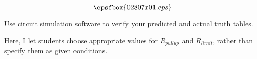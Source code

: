 

$$\epsfbox{02807x01.eps}$$

\vfil \eject






Use circuit simulation software to verify your predicted and actual truth tables.







Here, I let students choose appropriate values for $R_{pullup}$ and $R_{limit}$, rather than specify them as given conditions.




